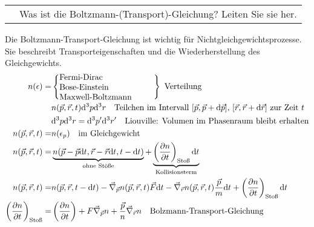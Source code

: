 \documentclass[a4paper,12pt]{scrartcl}
\makeatletter
\def\pf#1#2{\frac{\partial #1}{\partial #2}}		%
\def\ka#1{\left(#1\right)}				%
\def\d{\mathrm{d}}					%
\def\ddd{\mathrm{d}^3}					%
\newcounter{qc}\setcounter{qc}{1}
\newenvironment{fshaded}{
\def\FrameCommand{\fcolorbox{framecolor}{shadecolor}}
\MakeFramed {\FrameRestore}}
{\endMakeFramed}
\def\frage#1{
\begin{fshaded}
\noindent
\begin{tabularx}{0.99\textwidth}{@{}c!{\color{framecolor}\vline}X}
{ \bf \rm \theqc }	&	\noindent #1
\end{tabularx}
\stepcounter{qc}
\end{fshaded}
}
\makeatother
\begin{document}

\frage{Was ist die Boltzmann-(Transport)-Gleichung? Leiten Sie sie her.}
\noindent
Die Boltzmann-Transport-Gleichung ist wichtig für Nichtgleichgewichtsprozesse. Sie beschreibt Transporteigenschaften und die 
Wiederherstellung des Gleichgewichts.
\begin{align*}
	n(\epsilon)=&\left\{
		{
		\begin{minipage}[c]{4cm}
			Fermi-Dirac\\
			Bose-Einstein\\
			Maxwell-Boltzmann
		\end{minipage}
		}\right\}\text{ Verteilung}\\
		&n(\vec p,\vec r,t)\ddd p\ddd r\quad\text{Teilchen im Intervall $[\vec p,\vec p+\d\vec p]$, $[\vec r, \vec 
r+\d\vec r]$ zur Zeit $t$}\\
		&\ddd  p\ddd r=\ddd  p'\ddd r'\quad\text{Liouville: Volumen im Phasenraum bleibt erhalten}\\
		n(\vec p,\vec r,t)=&n(\epsilon_p)\quad\text{im Gleichgewicht}\\
		n(\vec p,\vec r,t)=&\underbrace{n(\vec p-\vec p\d t,\vec r-\vec r\d t,t-\d t)}_{\text{ohne 
Stöße}}+\underbrace{\ka{\pf nt}_{\text{Stoß}}\d t}_{\text{Kollisionsterm}}\\
		n(\vec p,\vec r,t)=&n(\vec p,\vec r,t-\d t)-\vec\nabla_{\vec p}n(\vec p,\vec r,t)\vec F\d t-\vec\nabla_{\vec r}n(\vec 
p,\vec r,t)\frac{\vec p}{m}\d t+\ka{\pf nt}_{\text{Stoß}}\d t\\
		\ka{\pf nt}_{\text{Stoß}}=&\ka{\pf nt}+F\vec\nabla_{\vec p}n+\frac{\vec p}n\vec\nabla_{\vec 
r}n\quad\text{Bolzmann-Transport-Gleichung}
\end{align*}

\end{document}
